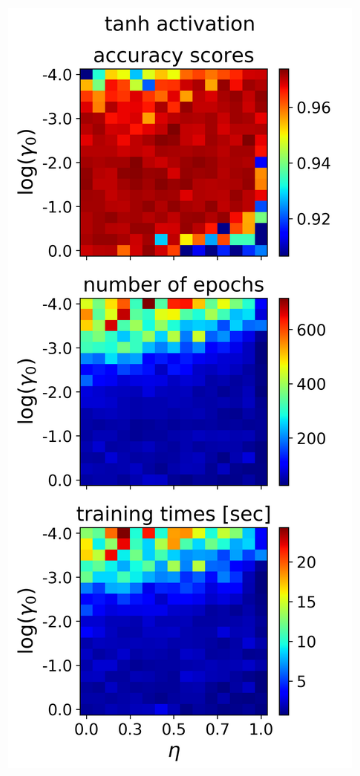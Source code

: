 \documentclass[nofootinbib,reprint,english]{revtex4-1}
\begin{document}
\begin{figure}[h!]
\begin{subfigure}{0.32\textwidth}
	\end{subfigure}
	~
	\begin{subfigure}{0.32\textwidth}
	\centering
	\includegraphics[scale=0.38]{../results/NN/img/gridsearch2_tanh2.png}

\end{subfigure}
\end{figure}
\end{document}
